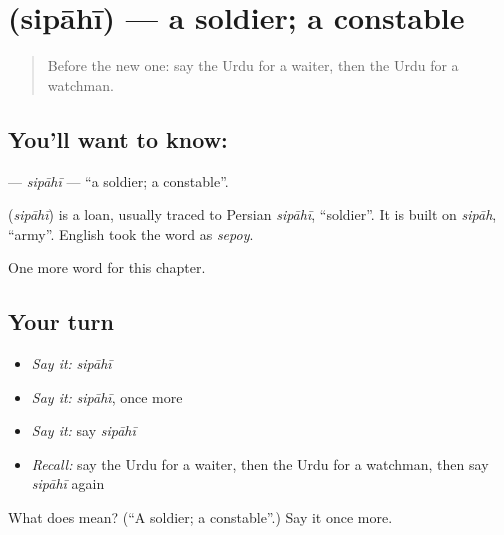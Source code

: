 \section[\texorpdfstring{\ur{سپاہی} (sipāhī)}{سپاہی (sipāhī)}]{ (sipāhī) — a soldier; a constable}

\label{lesson:UR-C237-sipahi}



\begin{quote}
Before the new one: say the Urdu for a waiter, then the Urdu for a watchman.
\end{quote}

\subsection*{You'll want to know: }
\textbf{} — \emph{sipāhī} — \textquotedblleft{}a soldier; a constable\textquotedblright{}.

\begin{cousinweb}
\textbf{} (\emph{sipāhī}) is a loan, usually traced to Persian \emph{sipāhī}, \textquotedblleft{}soldier\textquotedblright{}. It is built on \emph{sipāh}, \textquotedblleft{}army\textquotedblright{}. English took the word as \emph{sepoy}.
\end{cousinweb}

\begin{grammarlens}[title={What you've built}]
One more word for this chapter.
\end{grammarlens}

\subsection*{Your turn}
\begin{itemize}
\raggedright
  \item \emph{Say it:} \emph{sipāhī}
  \item \emph{Say it:} \emph{sipāhī}, once more
  \item \emph{Say it:} say \emph{sipāhī}
  \item \emph{Recall:} say the Urdu for a waiter, then the Urdu for a watchman, then say \emph{sipāhī} again
\end{itemize}

\begin{tcolorbox}[breakable,colback=teal!4,colframe=teal!35!black,title={Before you move on}]
What does  mean? (\textquotedblleft{}A soldier; a constable\textquotedblright{}.) Say it once more.
\end{tcolorbox}
